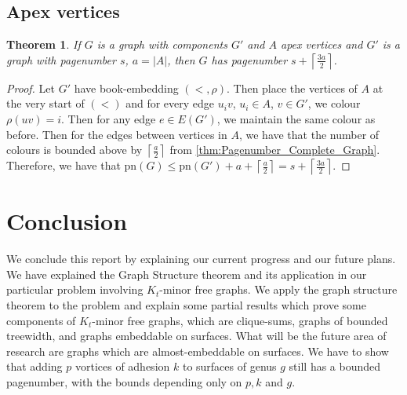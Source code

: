 \documentclass[]{report}
\newcommand{\pn}{\text{pn}}
\newtheorem{theorem}{Theorem}
\theoremstyle{definition}
\numberwithin{theorem}{section}
\numberwithin{equation}{section}
\begin{document}
\section{Apex vertices}
\begin{theorem}
	If $G$ is a graph with components $G'$ and $A$ apex vertices and $G'$ is a graph with pagenumber $s$, $a = |A|$, then $G$ has pagenumber $s + \left\lceil \frac{3a}{2}\right\rceil$. 
\end{theorem}
\begin{proof}
	Let $G'$ have book-embedding $(<, \rho)$. Then place the vertices of $A$ at the very start of $(<)$ and for every edge $u_iv$, $u_i \in A$, $v \in G'$, we colour $\rho(uv) = i$. Then for any edge $e \in E(G')$, we maintain the same colour as before. Then for the edges between vertices in $A$, we have that the number of colours is bounded above by $\left\lceil \frac{a}{2} \right\rceil$ from \cref{thm:Pagenumber_Complete_Graph}. Therefore, we have that $\pn(G) \leq \pn(G') + a + \left\lceil \frac{a}{2} \right\rceil =s + \left\lceil \frac{3a}{2}\right\rceil$. 
\end{proof}

\chapter{Conclusion}\label{chap:conclusion}
We conclude this report by explaining our current progress and our future plans. We have explained the Graph Structure theorem \cite{robertsonGraphMinorsXVI2003} and its application in our particular problem involving $K_t$-minor free graphs. We apply the graph structure theorem to the problem and explain some partial results which prove some components of $K_t$-minor free graphs, which are clique-sums, graphs of bounded treewidth, and graphs embeddable on surfaces. What will be the future area of research are graphs which are almost-embeddable on surfaces. We have to show that adding $p$ vortices of adhesion $k$ to surfaces of genus $g$ still has a bounded pagenumber, with the bounds depending only on $p, k$ and $g$. 
\printbibliography
\end{document}
